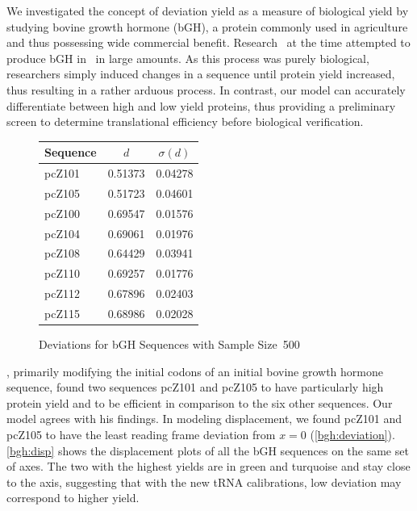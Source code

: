\documentclass[12pt]{article}
\numberwithin{equation}{section}
\begin{document}
We investigated the concept of deviation yield as a measure of biological
yield by studying bovine growth hormone (bGH), a protein commonly used
in agriculture and thus possessing wide commercial benefit.
Research~\cite{schoner:bgh} at the time attempted to produce bGH
in \ecoli\ in large amounts.  As this process was purely biological, researchers
simply induced changes in a sequence until protein yield increased, thus resulting
in a rather arduous process. In contrast, our model can accurately
differentiate between high and low yield proteins, thus providing a preliminary screen
to determine translational efficiency before biological verification.

\begin{figure}
\centering
\begin{singlespace}
    \begin{tabular}{lcc}
        \toprule
        \textbf{Sequence} & $d$ & $\sigma(d)$\\
        \midrule
        pcZ101 & 0.51373 & 0.04278 \\
        pcZ105 & 0.51723 & 0.04601 \\
        \midrule
        pcZ100 & 0.69547 & 0.01576 \\
        pcZ104 & 0.69061 & 0.01976 \\
        pcZ108 & 0.64429 & 0.03941 \\
        pcZ110 & 0.69257 & 0.01776 \\
        pcZ112 & 0.67896 & 0.02403 \\
        pcZ115 & 0.68986 & 0.02028 \\
        \bottomrule
    \end{tabular}
    \caption{Deviations for bGH Sequences with Sample Size~500}
    \label{bgh:deviation}
\end{singlespace}
\end{figure}

\citet{schoner:bgh}, primarily modifying the initial codons of an initial
bovine growth hormone sequence, found two sequences pcZ101 and pcZ105
to have particularly high protein yield and to be efficient in
comparison to
the six other sequences. Our model agrees with his findings. In modeling displacement,
we found pcZ101 and pcZ105 to have the least reading frame deviation
from $x = 0$ (\autoref{bgh:deviation}). \autoref{bgh:disp} shows the displacement
plots of all the bGH sequences on the same set of axes.  The two with the highest yields
are in green and turquoise and stay close to the axis, suggesting that with the
new tRNA calibrations, low deviation may correspond to higher yield.
\end{document}
